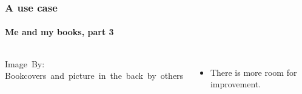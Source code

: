 \begin{frame}
	\frametitle{A use case}
	\framesubtitle{Me and my books, part 3}
	\begin{columns}
	\begin{center}
		\hspace*{15pt}\hbox{\scriptsize Image By:}
		\hspace*{15pt}\hbox{\scriptsize Bookcovers and picture in the back by others}
	\end{center}
		\begin{itemize}
			\item There is more room for improvement.
				

\end{itemize}
\end{columns}
\end{frame}
